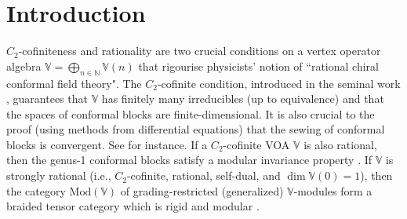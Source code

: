 \documentclass[11pt,b5paper,notitlepage]{article}
\theoremstyle{definition}
\theoremstyle{plain}
\newcommand{\Vbb}{\mathbb V}
\newcommand{\Nbb}{\mathbb N}
\newcommand{\<}{\left\langle}
\renewcommand{\>}{\right\rangle}
\newcommand{\Mod}{\mathrm{Mod}}
\numberwithin{equation}{section}
\begin{document}
\tableofcontents




	
	
	
	

	
	

	
	
	
	
	
	
	
	
	

	




\section{Introduction}


\nocite{HLZ1,HLZ2,HLZ3,HLZ4,HLZ5,HLZ6,HLZ7,HLZ8}


$C_2$-cofiniteness and rationality are two crucial conditions on a vertex operator algebra $\Vbb=\bigoplus_{n\in\Nbb}\Vbb(n)$ that rigourise physicists' notion of ``rational chiral conformal field theory". The $C_2$-cofinite condition, introduced in the seminal work \cite{Zhu-modular-invariance}, guarantees that $\Vbb$ has finitely many irreducibles (up to equivalence) and that the spaces of conformal blocks are finite-dimensional. It is also crucial to the proof (using methods from differential equations) that the sewing of conformal blocks is convergent. See \cite{Zhu-modular-invariance,AN03-finite-dimensional,Miy-modular-invariance,Hua-differential-genus-0,Hua-differential-genus-1,NT-P1_conformal_blocks,Fio-genus-1,DGT2,Gui-sewingconvergence} for instance. If a $C_2$-cofinite VOA $\Vbb$ is also rational, then the genus-1 conformal blocks satisfy a modular invariance property \cite{Zhu-modular-invariance,DLM-modular-invariance,Hua-differential-genus-1}. If $\Vbb$ is strongly rational (i.e., $C_2$-cofinite, rational, self-dual, and $\dim\Vbb(0)=1$), then the category $\Mod(\Vbb)$ of grading-restricted (generalized) $\Vbb$-modules form a braided tensor category \cite{HL-tensor-1,HL-tensor-2,HL-tensor-3,Hua-tensor-4,Hua-differential-genus-0,NT-P1_conformal_blocks} which is rigid and modular \cite{Hua-rigidity-modularity}. 
\end{document}
